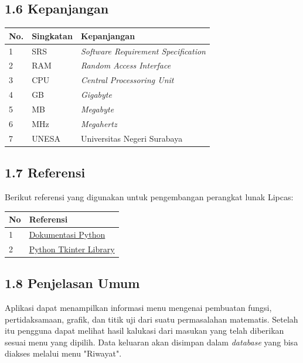 \documentclass[a4paper]{article}
\begin{document}
    \subsection*{1.6 Kepanjangan}
    \begin{tabular}{ | m{1em}| m{} | m{} | }
        \hline
        \textbf{No.} & \textbf{Singkatan}   & \textbf{Kepanjangan}\\
        \hline
        1 & SRS & \textit{Software Requirement Specification}\\
        \hline
        2 & RAM & \textit{Random Access Interface}\\
        \hline
        3 & CPU & \textit{Central Processoring Unit}\\
        \hline
        4 & GB & \textit{Gigabyte}\\
        \hline
        5 & MB & \textit{Megabyte}\\
        \hline
        6 & MHz & \textit{Megahertz}\\
        \hline
        7 & UNESA & Universitas Negeri Surabaya \\
        \hline
    \end{tabular}
    \subsection*{1.7 Referensi}
    \noindent Berikut referensi yang digunakan untuk pengembangan perangkat
    lunak Lipcas:

    \vspace*{10pt}
    \begin{tabular}{ | m{1em}| m{} | }
       \hline 
       \textbf{No} & \textbf{Referensi}\\
       \hline
       1 & \href{https://wiki.python.org/moin/BeginnersGuide}{Dokumentasi Python} \\
       \hline
       2 & \href{https://docs.python.org/3/library/tk.html}{Python Tkinter Library}\\
       \hline
    \end{tabular}

    \subsection*{1.8 Penjelasan Umum}
    \noindent Aplikasi dapat menampilkan informasi menu mengenai
    pembuatan fungsi, pertidaksamaan, grafik, dan titik uji
    dari suatu permasalahan matematis. Setelah itu pengguna 
    dapat melihat hasil kalukasi dari masukan yang telah diberikan
    sesuai menu yang dipilih. Data keluaran akan disimpan dalam
    \textit{database} yang bisa diakses melalui menu "Riwayat".
\end{document}
